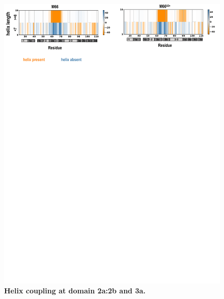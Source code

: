 \documentclass[10pt,letterpaper]{article}
\begin{document}
\begin{figure}[!ht]
\includegraphics[scale=0.5,width=12cm,trim={0 0cm 0 0cm},clip]{../figures/n2.pdf}
\caption{{\bf  Helix coupling at domain 2a:2b and 3a.}
 }
\label{fig6}
\end{figure}
\end{document}
